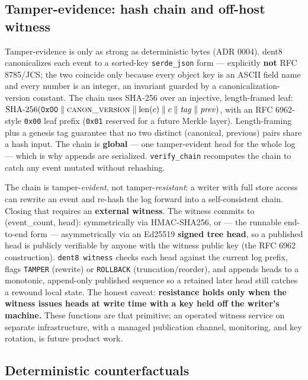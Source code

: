 \documentclass[11pt]{article}
\newcommand{\code}[1]{\texttt{#1}}
\begin{document}
\subsection{Tamper-evidence: hash chain and off-host witness}

Tamper-evidence is only as strong as deterministic bytes (ADR 0004). dent8 canonicalizes each event to a sorted-key \code{serde\_json} form --- explicitly \textbf{not} RFC 8785/JCS; the two coincide only because every object key is an ASCII field name and every number is an integer, an invariant guarded by a canonicalization-version constant. The chain uses SHA-256 over an injective, length-framed leaf: $\mathrm{SHA\text{-}256}(\mathtt{0x00} \parallel \textsc{canon\_version} \parallel \mathrm{len}(c) \parallel c \parallel \mathit{tag} \parallel \mathit{prev})$, with an RFC 6962-style \code{0x00} leaf prefix (\code{0x01} reserved for a future Merkle layer). Length-framing plus a genesis tag guarantee that no two distinct (canonical, previous) pairs share a hash input. The chain is \textbf{global} --- one tamper-evident head for the whole log --- which is why appends are serialized. \code{verify\_chain} recomputes the chain to catch any event mutated without rehashing.

The chain is tamper-\emph{evident}, not tamper-\emph{resistant}: a writer with full store access can rewrite an event and re-hash the log forward into a self-consistent chain. Closing that requires an \textbf{external witness}. The witness commits to (event\_count, head): symmetrically via HMAC-SHA256, or --- the runnable end-to-end form --- asymmetrically via an Ed25519 \textbf{signed tree head}, so a published head is publicly verifiable by anyone with the witness public key (the RFC 6962 construction). \code{dent8 witness} checks each head against the current log prefix, flags \code{TAMPER} (rewrite) or \code{ROLLBACK} (truncation/reorder), and appends heads to a monotonic, append-only published sequence so a retained later head still catches a rewound local state. The honest caveat: \textbf{resistance holds only when the witness issues heads at write time with a key held off the writer's machine.} These functions are that primitive; an operated witness service on separate infrastructure, with a managed publication channel, monitoring, and key rotation, is future product work.

\subsection{Deterministic counterfactuals}
\end{document}
